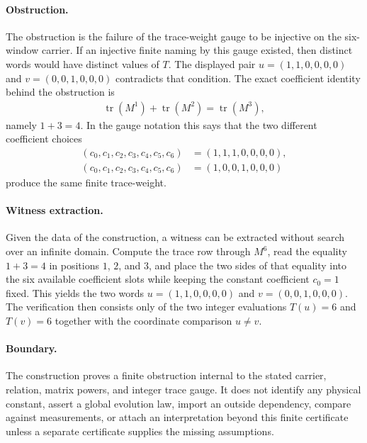 \paragraph{Obstruction.}
The obstruction is the failure of the trace-weight gauge to be injective on the six-window carrier.  If an injective finite naming by this gauge existed, then distinct words would have distinct values of $T$.  The displayed pair $u=(1,1,0,0,0,0)$ and $v=(0,0,1,0,0,0)$ contradicts that condition.  The exact coefficient identity behind the obstruction is
$$
\begin{aligned}
\operatorname{tr}(M^1)+\operatorname{tr}(M^2)=\operatorname{tr}(M^3),
\end{aligned}
$$
namely $1+3=4$.  In the gauge notation this says that the two different coefficient choices
$$
\begin{aligned}
(c_0,c_1,c_2,c_3,c_4,c_5,c_6)&=(1,1,1,0,0,0,0),\\
(c_0,c_1,c_2,c_3,c_4,c_5,c_6)&=(1,0,0,1,0,0,0)
\end{aligned}
$$
produce the same finite trace-weight.

\paragraph{Witness extraction.}
Given the data of the construction, a witness can be extracted without search over an infinite domain.  Compute the trace row through $M^6$, read the equality $1+3=4$ in positions $1$, $2$, and $3$, and place the two sides of that equality into the six available coefficient slots while keeping the constant coefficient $c_0=1$ fixed.  This yields the two words $u=(1,1,0,0,0,0)$ and $v=(0,0,1,0,0,0)$.  The verification then consists only of the two integer evaluations $T(u)=6$ and $T(v)=6$ together with the coordinate comparison $u\neq v$.

\paragraph{Boundary.}
The construction proves a finite obstruction internal to the stated carrier, relation, matrix powers, and integer trace gauge.  It does not identify any physical constant, assert a global evolution law, import an outside dependency, compare against measurements, or attach an interpretation beyond this finite certificate unless a separate certificate supplies the missing assumptions.